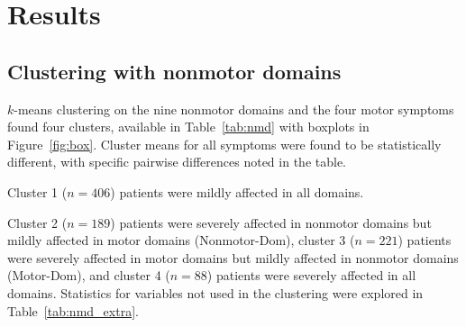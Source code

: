 \documentclass[preprint,3p,twocolumn]{elsarticle} %
\begin{document}
\section{Results}

\subsection{Clustering with nonmotor domains}

$k$-means clustering on the nine nonmotor domains and the four motor symptoms found four clusters,
available in Table~\ref{tab:nmd} with boxplots in Figure~\ref{fig:box}. Cluster means for all
symptoms were found to be statistically different, with specific pairwise differences noted in the table.

Cluster 1 ($n = 406$) patients were mildly affected in all domains.

Cluster 2 ($n = 189$) patients were severely
affected in nonmotor domains but mildly affected in motor domains (Nonmotor-Dom), cluster 3 ($n =
221$) patients were severely affected in motor domains but mildly affected in nonmotor domains
(Motor-Dom), and cluster 4 ($n = 88$) patients were severely affected in all domains. Statistics
for variables not used in the clustering were explored in Table~\ref{tab:nmd_extra}.
\end{document}
